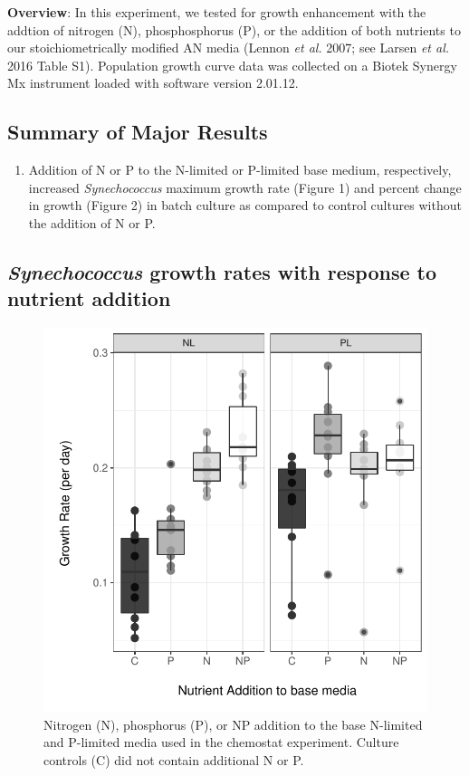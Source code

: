 \documentclass[]{article}
\providecommand{\tightlist}{%
  \setlength{\itemsep}{0pt}\setlength{\parskip}{0pt}}
\begin{document}
\textbf{Overview}: In this experiment, we tested for growth enhancement
with the addtion of nitrogen (N), phosphosphorus (P), or the addition of
both nutrients to our stoichiometrically modified AN media (Lennon
\emph{et al.} 2007; see Larsen \emph{et al.} 2016 Table S1). Population
growth curve data was collected on a Biotek Synergy Mx instrument loaded
with software version 2.01.12.

\subsection{Summary of Major Results}\label{summary-of-major-results}

\begin{enumerate}
\def\labelenumi{\arabic{enumi}.}
\tightlist
\item
  Addition of N or P to the N-limited or P-limited base medium,
  respectively, increased \emph{Synechococcus} maximum growth rate
  (Figure 1) and percent change in growth (Figure 2) in batch culture as
  compared to control cultures without the addition of N or P.
\end{enumerate}

\newpage

\subsection{\texorpdfstring{\emph{Synechococcus} growth rates with
response to nutrient
addition}{Synechococcus growth rates with response to nutrient addition}}\label{synechococcus-growth-rates-with-response-to-nutrient-addition}

\begin{figure}[htbp]
\centering
\includegraphics{analysis_ecoevostoich_files/figure-latex/gr-vis-1.pdf}
\caption{Nitrogen (N), phosphorus (P), or NP addition to the base
N-limited and P-limited media used in the chemostat experiment. Culture
controls (C) did not contain additional N or P.}
\end{figure}
\end{document}
